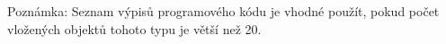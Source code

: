 \clearpage
\lstlistoflistings
Poznámka: Seznam výpisů programového kódu je vhodné použít, pokud počet vložených objektů tohoto typu je větší než 20. 